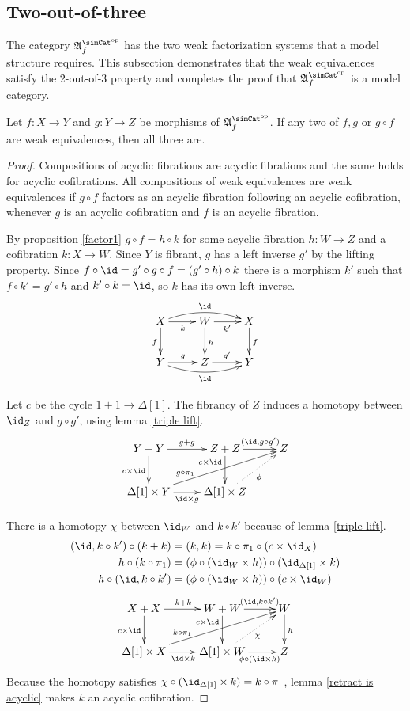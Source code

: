 \documentclass{tac}
\newcommand\dual{^{\mathrm{op}}}
\newcommand\s{^{\simCat\dual}}
\newcommand\of{:}
\newcommand\simplex\Delta
\newcommand\f{_f}
\newcommand\ambient{\mathfrak A}
\begin{document}
\subsection{Two-out-of-three}
The category $\ambient\s\f$ has the two weak factorization systems that a model structure requires. This subsection demonstrates that the weak equivalences satisfy the 2-out-of-3 property and completes the proof that $\ambient\s\f$ is a model category.

\begin{lemma}[2-out-of-3] Let $f\of X\to Y$ and $g\of Y\to Z$ be morphisms of $\ambient\s\f$. If any two of $f,g$ or $g\circ f$ are weak equivalences, then all three are. \label{toot}\end{lemma}

\begin{proof}
Compositions of acyclic fibrations are acyclic fibrations and the same holds for acyclic cofibrations. All compositions of weak equivalences are weak equivalences if $g\circ f$ factors as an acyclic fibration following an acyclic cofibration, whenever $g$ is an acyclic cofibration and $f$ is an acyclic fibration.

By proposition \ref{factor1} $g\circ f=h\circ k$ for some acyclic fibration $h\of W\to Z$ and a cofibration $k\of X\to W$. Since $Y$ is fibrant, $g$ has a left inverse $g'$ by the lifting property. Since $f \circ \id = g'\circ g\circ f= (g'\circ h)\circ k$ there is a morphism $k'$ such that $f\circ k' = g'\circ h$ and $k'\circ k = \id$, so $k$ has its own left inverse.
\[\xymatrix{
X\ar[d]_f \ar[r]_{k} \ar@/^2ex/[rr]^{\id} & W\ar[d]^h \ar[r]_{k'} & X\ar[d]^f\\
Y \ar[r]^{g} \ar@/_2ex/[rr]_{\id} & Z \ar[r]^{g'} & Y
}\]

Let $c$ be the cycle $1+1\to\simplex[1]$. The fibrancy of $Z$ induces a homotopy between $\id_Z$ and $g\circ g'$, using lemma \ref{triple lift}.
\[\xymatrix{
Y+Y\ar[r]^{g+g}\ar[d]_{c\times\id} & Z+Z\ar[r]^(.6){(\id,g\circ g')}\ar[d]_(.3){c\times\id} & Z\\
\simplex[1]\times Y\ar[r]_{\id\times g}\ar[urr]^(.3){g\circ\pi_1} & \simplex[1]\times Z\ar@{.>}[ur]_{\phi}
}\]

There is a homotopy $\chi$ between $\id_W$ and $k\circ k'$ because of lemma \ref{triple lift}.
\begin{align*}
(\id, k\circ k')\circ (k+k) &= (k,k) = k\circ \pi_1\circ(c\times\id_X)\\
h\circ (k \circ \pi_1) &= (\phi\circ (\id_W\times h))\circ (\id_{\simplex[1]} \times k)\\
h\circ (\id, k\circ k') &= (\phi\circ (\id_W\times h))\circ (c\times \id_W)
\end{align*}
\[\xymatrix{
X+X\ar[d]_{c\times \id}\ar[r]^{k+k} & W+W\ar[d]_(.3){c\times \id}\ar[r]^(.6){(\id,k\circ k')} & W\ar[d]^h\\
\simplex[1]\times X\ar[r]_{\id\times k} \ar[urr]^(.3){k\circ \pi_1}  & \simplex[1]\times W\ar[r]_(.6){\phi\circ (\id\times h)} \ar@{.>}[ur]_\chi & Z
}\]
Because the homotopy satisfies $\chi\circ(\id_{\simplex[1]}\times k) = k\circ \pi_1$, lemma \ref{retract is acyclic} makes $k$ an acyclic cofibration.


\end{proof}
\end{document}
